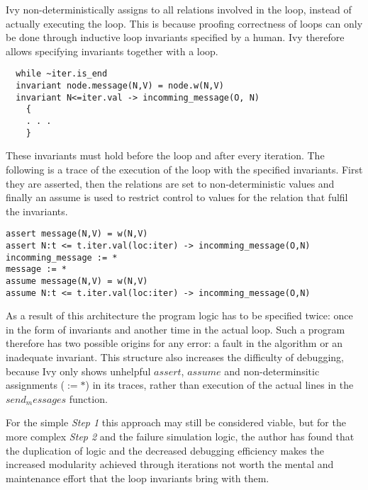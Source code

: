 \documentclass[fleqn]{article}
\begin{document}
Ivy non-deterministically assigns to all relations involved in the loop, instead of actually executing the loop.  This is because proofing correctness of loops can only be done through inductive loop invariants specified by a human. Ivy therefore allows specifying invariants together with a loop.
\begin{mdframed}[backgroundcolor=light-gray, roundcorner=10pt,leftmargin=1, rightmargin=1, innerleftmargin=15, innertopmargin=15,innerbottommargin=15, outerlinewidth=1, linecolor=light-gray]
\begin{lstlisting}
  while ~iter.is_end
  invariant node.message(N,V) = node.w(N,V)
  invariant N<=iter.val -> incomming_message(O, N)
	{
    . . .
	}
\end{lstlisting}
\end{mdframed}

These invariants must hold before the loop and after every iteration. The following is a trace of the execution of the loop with the specified invariants. First they are asserted, then the relations are set to non-deterministic values and finally an assume is used to restrict control to values for the relation that fulfil the invariants.

\begin{mdframed}[backgroundcolor=light-gray, roundcorner=10pt,leftmargin=1, rightmargin=1, innerleftmargin=15, innertopmargin=15,innerbottommargin=15, outerlinewidth=1, linecolor=light-gray]
\begin{lstlisting}
assert message(N,V) = w(N,V)
assert N:t <= t.iter.val(loc:iter) -> incomming_message(O,N)
incomming_message := *
message := *
assume message(N,V) = w(N,V)
assume N:t <= t.iter.val(loc:iter) -> incomming_message(O,N)
\end{lstlisting}
\end{mdframed}

As a result of this architecture the program logic has to be specified twice: once in the form of invariants and another time in the actual loop. Such a program therefore has two possible origins for any error: a fault in the algorithm or an inadequate invariant. This structure also increases the difficulty of debugging, because Ivy only shows unhelpful $assert$, $assume$ and  non-determinsitic assignments ($:= *$) in its traces, rather than execution of the actual lines in the $send_messages$ function.

For the simple \textit{Step 1} this approach may still be considered viable, but for the more complex \textit{Step 2} and the failure simulation logic, the author has found that the duplication of logic and the decreased debugging efficiency makes the increased modularity achieved through iterations not worth the mental and maintenance effort that the loop invariants bring with them.
\end{document}
